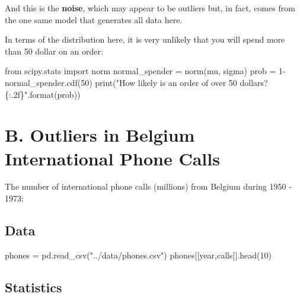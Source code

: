 \documentclass[
  letterpaper,
]{scrbook}
\newenvironment{Shaded}{\begin{snugshade}}{\end{snugshade}}
\newcommand{\BuiltInTok}[1]{\textcolor[rgb]{0.00,0.23,0.31}{#1}}
\newcommand{\DecValTok}[1]{\textcolor[rgb]{0.68,0.00,0.00}{#1}}
\newcommand{\ImportTok}[1]{\textcolor[rgb]{0.00,0.46,0.62}{#1}}
\newcommand{\NormalTok}[1]{\textcolor[rgb]{0.00,0.23,0.31}{#1}}
\newcommand{\OperatorTok}[1]{\textcolor[rgb]{0.37,0.37,0.37}{#1}}
\newcommand{\SpecialCharTok}[1]{\textcolor[rgb]{0.37,0.37,0.37}{#1}}
\newcommand{\StringTok}[1]{\textcolor[rgb]{0.13,0.47,0.30}{#1}}
\begin{document}
And this is the \textbf{noise}, which may appear to be outliers but, in
fact, comes from the one same model that generates all data here.

In terms of the distribution here, it is very unlikely that you will
spend more than 50 dollar on an order:

\begin{Shaded}
\begin{Highlighting}[]
\ImportTok{from}\NormalTok{ scipy.stats }\ImportTok{import}\NormalTok{ norm}
\NormalTok{normal\_spender }\OperatorTok{=}\NormalTok{ norm(mu, sigma)}
\NormalTok{prob }\OperatorTok{=} \DecValTok{1}\OperatorTok{{-}}\NormalTok{normal\_spender.cdf(}\DecValTok{50}\NormalTok{)}
\BuiltInTok{print}\NormalTok{(}\StringTok{"How likely is an order of over 50 dollars? }\SpecialCharTok{\{:.2f\}}\StringTok{"}\NormalTok{.}\BuiltInTok{format}\NormalTok{(prob))}
\end{Highlighting}
\end{Shaded}

\section*{B. Outliers in Belgium International Phone
Calls}\label{b.-outliers-in-belgium-international-phone-calls}


The number of international phone calls (millions) from Belgium during
1950 - 1973:

\subsection*{Data}\label{data-1}

\begin{Shaded}
\begin{Highlighting}[]
\NormalTok{phones }\OperatorTok{=}\NormalTok{ pd.read\_csv(}\StringTok{"../data/phones.csv"}\NormalTok{)}
\NormalTok{phones[[}\StringTok{\textquotesingle{}year\textquotesingle{}}\NormalTok{,}\StringTok{\textquotesingle{}calls\textquotesingle{}}\NormalTok{]].head(}\DecValTok{10}\NormalTok{)}
\end{Highlighting}
\end{Shaded}

\subsection*{Statistics}\label{statistics}
\end{document}
